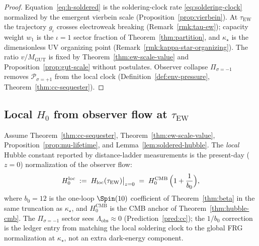 \begin{proof}
Equation~\eqref{eq:h-soldered} is the soldering-clock rate
\eqref{eq:soldering-clock} normalized by the emergent vierbein scale
(Proposition~\ref{prop:vierbein}). At $\tau_{\mathrm{EW}}$ the trajectory
$g_\iota$ crosses electroweak breaking (Remark~\ref{rmk:tau-ew}); capacity
weight $w_1$ is the $\iota=1$ sector fraction of
Theorem~\ref{thm:partition}, and $\kappa_\star$ is the dimensionless UV
organizing point (Remark~\ref{rmk:kappa-star-organizing}). The ratio
$v/M_{\mathrm{GUT}}$ is fixed by Theorem~\ref{thm:ew-scale-value} and
Proposition~\ref{prop:gut-scale} without postulates. Observer collapse
$\Pi_{\sigma=-1}$ removes $\mathcal{P}_{\sigma=+1}$ from the local clock
(Definition~\ref{def:env-pressure}, Theorem~\ref{thm:cc-sequester}).
\end{proof}

\subsection{Local $H_0$ from observer flow at $\tau_{\mathrm{EW}}$}
\label{sec:cosmology:local}

\begin{theorem}
\label{thm:hubble-local}
Assume Theorem~\ref{thm:cc-sequester}, Theorem~\ref{thm:ew-scale-value},
Proposition~\ref{prop:mu-lifetime}, and Lemma~\ref{lem:soldered-hubble}.
The \emph{local} Hubble constant reported by distance-ladder measurements is
the present-day ($z=0$) normalization of the observer flow:
\begin{equation}\label{eq:h0-local}
  H_0^{\mathrm{loc}}
  \;:=\;
  H_{\mathrm{loc}}(\tau_{\mathrm{EW}})\big|_{z=0}
  \;=\;
  H_0^{\mathrm{CMB}}\,
  \Bigl(1+\frac{1}{b_0}\Bigr),
\end{equation}
where $b_0=12$ is the one-loop $\Spin(10)$ coefficient of
Theorem~\ref{thm:beta} in the same truncation as $\kappa_\star$, and
$H_0^{\mathrm{CMB}}$ is the CMB anchor of Theorem~\ref{thm:hubble-cmb}.
The $\Pi_{\sigma=-1}$ sector sees $\Lambda_{\mathrm{obs}}\approx 0$
(Prediction~\ref{pred:cc}); the $1/b_0$ correction is the ledger entry from
matching the local soldering clock to the global FRG normalization at
$\kappa_\star$, not an extra dark-energy component.
\end{theorem}

